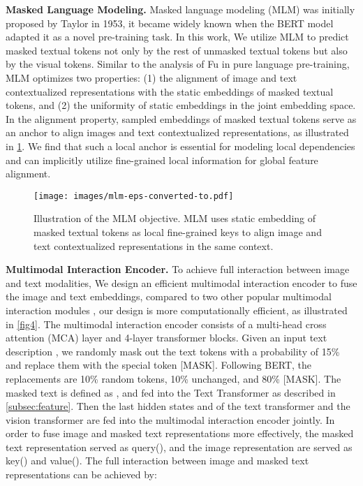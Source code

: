 \documentclass[10pt,twocolumn,letterpaper]{article}
\begin{document}
\textbf{Masked Language Modeling.} Masked language modeling (MLM) was initially proposed by Taylor\cite{taylor1953cloze} in 1953, it became widely known when the BERT model adapted it as a novel pre-training task. 
In this work, We utilize MLM to predict masked textual tokens not only by the rest of unmasked textual tokens but also by the visual tokens. 
Similar to the analysis of Fu \etal \cite{fu2022contextual} in pure language pre-training, MLM optimizes two properties: (1) the alignment of image and text contextualized representations with the static embeddings of masked textual tokens, and (2) the uniformity of static embeddings in the joint embedding space. In the alignment property, sampled embeddings of masked textual tokens serve as an anchor to align images and text contextualized representations, as illustrated in \cref{fig3}. We find that such a local anchor is essential for modeling local dependencies and can implicitly utilize fine-grained local information for global feature alignment.

\begin{figure}[ht]
  \centerline{\texttt{[image: images/mlm-eps-converted-to.pdf]}}
  \caption{Illustration of the MLM objective. MLM uses static embedding of masked textual tokens as local fine-grained keys to align image and text contextualized representations in the same context.}
  \label{fig3}
  \vspace{-3mm}
\end{figure}

\textbf{Multimodal Interaction Encoder.}
To achieve full interaction between image and text modalities, We design an efficient multimodal interaction encoder to fuse the image and text embeddings, compared to two other popular multimodal interaction modules \cite{hendricks2021decoupling,dou2022empirical}, our design is more computationally efficient, as illustrated in \cref{fig4}. The multimodal interaction encoder consists of a multi-head cross attention (MCA) layer and 4-layer transformer blocks.
Given an input text description , we randomly mask out the text tokens with a probability of 15\% and replace them with the special token [MASK]. Following BERT, the replacements are 10\% random tokens, 10\% unchanged, and 80\% [MASK]. The masked text is defined as , and fed into the Text Transformer as described in \cref{subsec:feature}. Then the last hidden states  and  of the text transformer and the vision transformer are fed into the multimodal interaction encoder jointly. In order to fuse image and masked text representations more effectively, the masked text representation  served as query(), and the image representation  are served as key() and value(). The full interaction between image and masked text representations can be achieved by:
\end{document}
